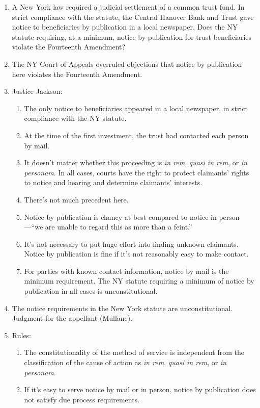 \begin{enumerate}
    \item A New York law required a judicial settlement of a common trust fund. In strict compliance with the statute, the Central Hanover Bank and Trust gave notice to beneficiaries by publication in a local newspaper. Does the NY statute requiring, at a minimum, notice by publication for trust beneficiaries violate the Fourteenth Amendment?
    \item The NY Court of Appeals overruled objections that notice by publication here violates the Fourteenth Amendment.
    \item Justice Jackson:
    \begin{enumerate}
        \item The only notice to beneficiaries appeared in a local newspaper, in strict compliance with the NY statute.
        \item At the time of the first investment, the trust had contacted each person by mail.
        \item It doesn't matter whether this proceeding is \emph{in rem}, \emph{quasi in rem}, or \emph{in personam}. In all cases, courts have the right to protect claimants' rights to notice and hearing and determine claimants' interests.
        \item There's not much precedent here.
        \item Notice by publication is chancy at best compared to notice in person---``we are unable to regard this as more than a feint.''
        \item It's not necessary to put huge effort into finding unknown claimants. Notice by publication is fine if it's not reasonably easy to make contact.
        \item For parties with known contact information, notice by mail is the minimum requirement. The NY statute requiring a minimum of notice by publication in all cases is unconstitutional.
    \end{enumerate}
    \item The notice requirements in the New York statute are unconstitutional. Judgment for the appellant (Mullane).
    \item Rules:
    \begin{enumerate}
       \item  The constitutionality of the method of service is independent from the classification of the cause of action as \emph{in rem}, \emph{quasi in rem}, or \emph{in personam}.
        \item If it's easy to serve notice by mail or in person, notice by publication does not satisfy due process requirements.
    \end{enumerate}
\end{enumerate}


